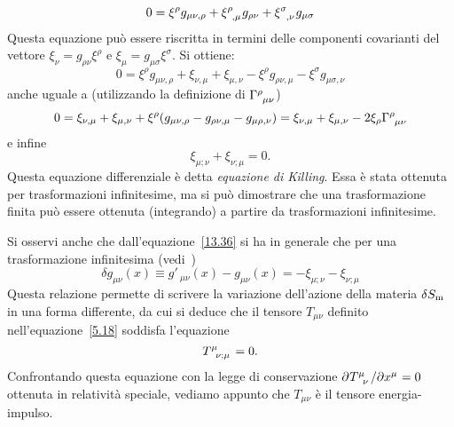 \begin{equation}
  0 = \xi^{\rho} g_{\mu \nu ,\rho} + \tensor{\xi}{^{\rho}_{,\mu}} g_{\rho \nu} +
  \tensor{\xi}{^{\sigma}_{,\nu}} g_{\mu \sigma}
\end{equation}
Questa equazione può essere riscritta in termini delle componenti covarianti del
vettore $\xi_{\nu} = g_{\rho \nu} \xi^{\rho}$ e $\xi_{\mu} = g_{\mu \sigma}
\xi^{\sigma}$.  Si ottiene:
\begin{equation}
  0 = \xi^{\rho} g_{\mu \nu ,\rho}
  +   \xi_{\nu,\mu} + \xi_{\mu,\nu}
  - \xi^{\rho} g_{\rho \nu,\mu} - \xi^{\sigma} g_{\mu \sigma,\nu}
\end{equation}
anche uguale a (utilizzando la definizione di $\tensor{\Gamma}{^{\rho}_{\mu
    \nu}}$)
\begin{equation}
  0 =   \xi_{\nu,\mu} + \xi_{\mu,\nu}
  + \xi^{\rho} (g_{\mu \nu,\rho}
  -             g_{\rho \nu,\mu} - g_{\mu \rho,\nu})
  =   \xi_{\nu,\mu} + \xi_{\mu,\nu} -2 \xi_{\rho} \tensor{\Gamma}{^{\rho}_{\mu
      \nu}}
\end{equation}
e infine
\begin{equation}
  \label{W13.1.5}
  \xi_{\mu;\nu}+\xi_{\nu;\mu} =0.
\end{equation}
Questa equazione differenziale è detta \emph{equazione di Killing}.  Essa è
stata ottenuta per trasformazioni infinitesime, ma si può dimostrare che una
trasformazione finita può essere ottenuta (integrando) a partire da
trasformazioni infinitesime.

Si osservi anche che dall'equazione~\eqref{13.36} si ha in generale che per una
trasformazione infinitesima (vedi~\textcite[355]{landau:campi})
\begin{equation}
  \delta g_{\mu \nu}(x) \equiv g'_{\ \mu \nu}(x) - g_{\mu \nu}(x) =
  -\xi_{\mu;\nu}-\xi_{\nu;\mu}
\label{L94.3}
\end{equation}
Questa relazione permette di scrivere la variazione dell'azione della materia
$\delta S_{\textup{m}}$ in una forma differente, da cui si deduce che il tensore
$T_{\mu \nu}$ definito nell'equazione~\eqref{5.18} soddisfa l'equazione
\begin{equation}
  \tensor{T}{^{\mu}_{\nu ; \mu}} = 0.
\end{equation}
Confrontando questa equazione con la legge di conservazione
$\lparder{\tensor{T}{^{\mu}_{\nu}}}{x^{\mu}}=0$ ottenuta in relatività speciale,
vediamo appunto che $T_{\mu \nu}$ è il tensore energia-impulso.

